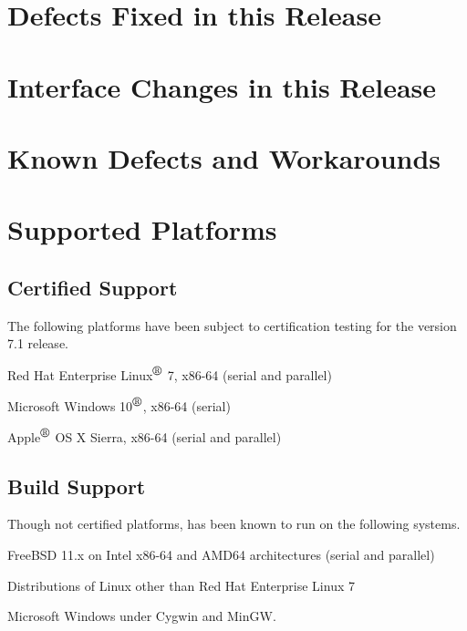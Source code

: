 \documentclass[letterpaper]{scrartcl}
\begin{document}
\newpage
\section{Defects Fixed in this Release}



\newpage
\section{Interface Changes in this Release}



\newpage
\section{Known Defects and Workarounds}



\newpage
\section{Supported Platforms}
\subsection*{Certified Support}
The following platforms have been subject to certification testing for the
\Xyce{} version 7.1 release.
\begin{XyceItemize}
  \item Red Hat Enterprise Linux${}^{\mbox{\textregistered}}$ 7, x86-64 (serial and parallel)
  \item Microsoft Windows 10${}^{\mbox{\textregistered}}$, x86-64 (serial)
  \item Apple${}^{\mbox{\textregistered}}$ OS X Sierra, x86-64 (serial and parallel)
\end{XyceItemize}

\subsection*{Build Support}
Though not certified platforms, \Xyce{} has been known to run on the following
systems.
\begin{XyceItemize}
  \item FreeBSD 11.x on Intel x86-64 and AMD64 architectures (serial
    and parallel)
  \item Distributions of Linux other than Red Hat Enterprise Linux 7
  \item Microsoft Windows under Cygwin and MinGW.
\end{XyceItemize}
\end{document}
